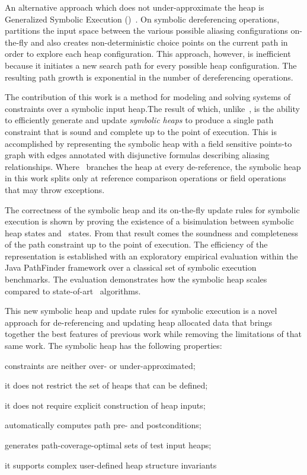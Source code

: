 An alternative approach which does not under-approximate the heap is
Generalized Symbolic Execution
(\gsetxt{})~\cite{Cadar:2008,KiasanKunit,GSE03,Rosner:2015}.  On symbolic
dereferencing operations,~\gsetxt{} partitions the input space between the
various possible aliasing configurations on-the-fly and also creates
non-deterministic choice points on the current path in order to
explore each heap configuration. This approach, however, is
inefficient because it initiates a new search path for every possible heap configuration.
The resulting path growth is exponential in the number of dereferencing operations.

The contribution of this work is a method for modeling and solving systems 
of constraints over a symbolic input heap.The
result of which, unlike~\gsetxt{}, is the ability to efficiently generate
and update \emph{symbolic heaps} to produce a single path constraint
that is sound and complete up to the point of execution. This is
accomplished by representing the symbolic heap with a field sensitive
points-to graph with edges annotated with disjunctive formulas
describing aliasing relationships. Where~\gsetxt{} branches the heap at every
de-reference, the symbolic heap in this work splits only at reference
comparison operations or field operations that may throw exceptions.

The correctness of the symbolic heap and its on-the-fly update rules
for symbolic execution is shown by proving the existence of a
bisimulation between symbolic heap states and~\gsetxt{} states. From that
result comes the soundness and completeness of the path constraint up
to the point of execution.  The efficiency of the representation is
established with an exploratory empirical evaluation within the Java
PathFinder framework over a classical set of symbolic execution
benchmarks. The evaluation demonstrates how the symbolic heap scales
compared to state-of-art~\gsetxt{} algorithms.

This new symbolic heap and update rules for symbolic execution is a
novel approach for de-referencing and updating heap allocated data
that brings together the best features of previous work while removing
the limitations of that same work. The symbolic heap has the following 
properties:
\begin{compactitem}
  \item constraints are neither over- or under-approximated;
  \item it does not restrict the set of heaps that can be defined;
  \item it does not require explicit construction of heap inputs;
  \item automatically computes path pre- and postconditions;
  \item generates path-coverage-optimal sets of test input heaps;
  \item it supports complex user-defined heap structure invariants 
\end{compactitem}


